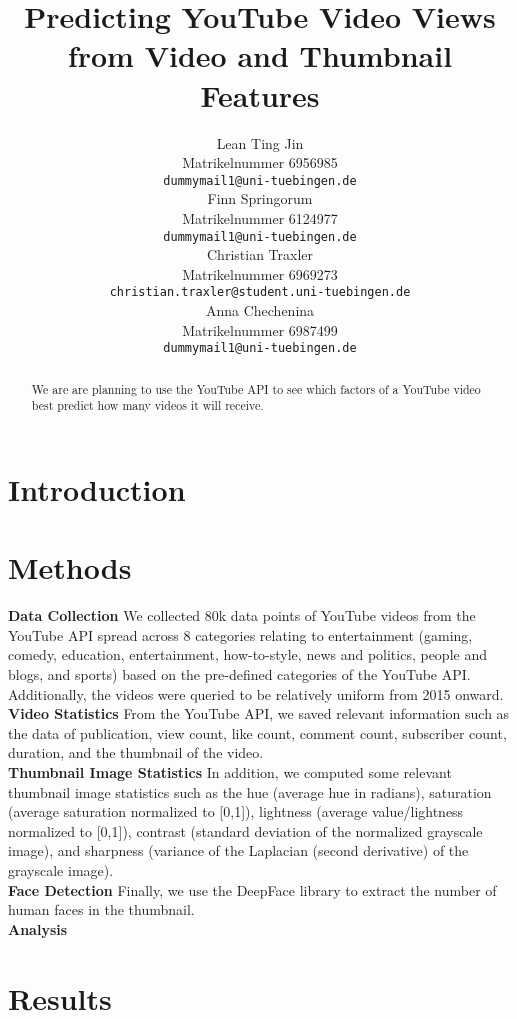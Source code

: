 \documentclass{article}
\title{Predicting YouTube Video Views \\from Video and Thumbnail Features}
\author{%
  Lean Ting Jin\\
  Matrikelnummer 6956985\\
  \texttt{dummymail1@uni-tuebingen.de} \\
  \And
  Finn Springorum\\
  Matrikelnummer 6124977\\
  \texttt{dummymail1@uni-tuebingen.de} \\
  \And
  Christian Traxler\\
  Matrikelnummer 6969273\\
  \texttt{christian.traxler@student.uni-tuebingen.de} \\
  \And
  Anna Chechenina\\
  Matrikelnummer 6987499\\
  \texttt{dummymail1@uni-tuebingen.de} \\
}
\begin{document}
\maketitle

\begin{abstract}
  We are are planning to use the YouTube API \cite{youtubeapi} to see which factors of a YouTube video best predict how many videos it will receive. 

\end{abstract}

\section{Introduction}

\section{Methods}
\textbf{Data Collection }We collected 80k data points of YouTube videos from the YouTube API spread across 8 categories relating to entertainment (gaming, comedy, education, entertainment, how-to-style, news and politics, people and blogs, and sports) based on the pre-defined categories of the YouTube API. Additionally, the videos were queried to be relatively uniform from 2015 onward. \\
\textbf{Video Statistics }From the YouTube API, we saved relevant information such as the data of publication, view count, like count, comment count, subscriber count, duration, and the thumbnail of the video. \\
\textbf{Thumbnail Image Statistics }In addition, we computed some relevant thumbnail image statistics such as the hue (average hue in radians), saturation (average saturation normalized to [0,1]), lightness (average value/lightness normalized to [0,1]), contrast (standard deviation of the normalized grayscale image), and sharpness (variance of the Laplacian (second derivative) of the grayscale image). \\
\textbf{Face Detection }Finally, we use the DeepFace library \cite{serengil2024lightface,serengil2020lightface} to extract the number of human faces in the thumbnail.
\\


\textbf{Analysis }


\section{Results}
\end{document}
